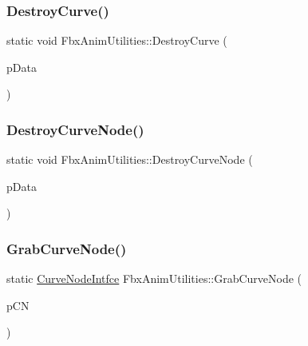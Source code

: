 \mbox{\label{class_fbx_anim_utilities_ac7f2b9fda23aceec40ed9416f768e207}} 
\subsubsection{\texorpdfstring{Destroy\+Curve()}{DestroyCurve()}}
{\footnotesize\ttfamily static void Fbx\+Anim\+Utilities\+::\+Destroy\+Curve (\begin{DoxyParamCaption}\item[{\hyperlink{class_fbx_anim_utilities_1_1_curve_intfce}{Curve\+Intfce} \&}]{p\+Data }\end{DoxyParamCaption})\hspace{0.3cm}{\ttfamily [static]}}

\mbox{\label{class_fbx_anim_utilities_a0dc57168a97e78aa496f50564b3861ff}} 
\subsubsection{\texorpdfstring{Destroy\+Curve\+Node()}{DestroyCurveNode()}}
{\footnotesize\ttfamily static void Fbx\+Anim\+Utilities\+::\+Destroy\+Curve\+Node (\begin{DoxyParamCaption}\item[{\hyperlink{class_fbx_anim_utilities_1_1_curve_node_intfce}{Curve\+Node\+Intfce} \&}]{p\+Data }\end{DoxyParamCaption})\hspace{0.3cm}{\ttfamily [static]}}

\mbox{\label{class_fbx_anim_utilities_ae558341ccc5b80be1cfbf26d14afae03}} 
\subsubsection{\texorpdfstring{Grab\+Curve\+Node()}{GrabCurveNode()}}
{\footnotesize\ttfamily static \hyperlink{class_fbx_anim_utilities_1_1_curve_node_intfce}{Curve\+Node\+Intfce} Fbx\+Anim\+Utilities\+::\+Grab\+Curve\+Node (\begin{DoxyParamCaption}\item[{\hyperlink{class_fbx_anim_curve_node}{Fbx\+Anim\+Curve\+Node} $\ast$}]{p\+CN }\end{DoxyParamCaption})\hspace{0.3cm}{\ttfamily [static]}}

